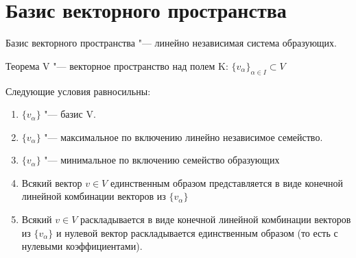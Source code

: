 ﻿

\section{Базис векторного пространства}

\begin{Def}                          
    Базис векторного пространства "--- линейно независимая система образующих.
\end{Def}

\begin{theorem}
Теорема V "--- векторное пространство над  полем K:
$\{v_{\alpha}\}_{\alpha \in I} \subset V$

Следующие условия равносильны: 

\begin{enumerate}
\item $\{v_{\alpha}\}$ "--- базис  V.
\item $\{v_{\alpha}\}$ "--- максимальное по включению линейно независимое семейство.
\item $\{v_{\alpha}\}$ "--- минимальное по включению семейство образующих
\item Всякий вектор $v \in V$  единственным образом представляется в виде конечной
линейной комбинации векторов из $\{v_{\alpha}\}$
\item Всякий $v \in V$ раскладывается в виде конечной линейной комбинации векторов из 
$\{v_{\alpha}\}$ и нулевой вектор 
раскладывается единственным образом (то есть с нулевыми коэффициентами).
\end{enumerate}
\end{theorem}
